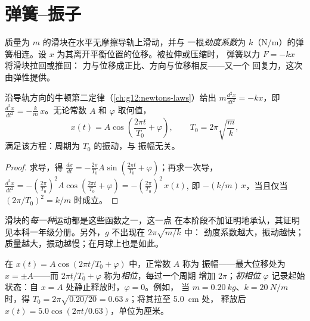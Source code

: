 \section{弹簧–振子}

\begin{definition}[弹簧的回复力]\label{def:g12:oscillators-and-time:spring}
质量为 $m$ 的滑块在水平无摩擦导轨上滑动，并与
一根\emph{劲度系数}为 $k$（\unit{N/m}）的弹簧相连。设
$x$ 为其离开平衡位置的位移。被拉伸或压缩时，
弹簧以力 $F = -kx$ 将滑块拉回或推回：
力与位移成正比、方向与位移相反——又一个
回复力，这次由弹性提供。
\end{definition}

\begin{proposition}[运动方程及其解]\label{prop:g12:oscillators-and-time:spring-period}
沿导轨方向的牛顿第二定律（\cref{ch:g12:newtons-laws}）给出
$m \frac{d^2x}{dt^2} = -kx$，即 $\frac{d^2x}{dt^2} =
-\frac{k}{m}\,x$。无论常数 $A$ 和 $\varphi$ 取何值，
\[
x(t) = A \cos\!\left(\frac{2\pi t}{T_0} + \varphi\right),
\qquad T_0 = 2\pi\sqrt{\frac{m}{k}},
\]
满足该方程：周期为 $T_0$ 的振动，与
振幅无关。
\end{proposition}

\begin{proof}
求导，得 $\frac{dx}{dt} = -\frac{2\pi}{T_0}A \sin(\frac{2\pi
t}{T_0} + \varphi)$；再求一次导，$\frac{d^2x}{dt^2} = -(\frac{2\pi}{T_0})^2
A\cos(\frac{2\pi t}{T_0} + \varphi) = -(\frac{2\pi}{T_0})^2\,x(t)$,
即 $-(k/m)\,x$，当且仅当 $(2\pi/T_0)^2 = k/m$ 时成立。
\end{proof}

\begin{remark}[所有可能的运动]\label{rem:g12:oscillators-and-time:uniqueness}
滑块的\emph{每一种}运动都是这些函数之一，这一点
在本阶段不加证明地承认，其证明见本科一年级分册。另外，$g$ 不出现在 $2\pi\sqrt{m/k}$ 中：
劲度系数越大，振动越快；质量越大，振动越慢；在月球上也是如此。
\end{remark}

\begin{definition}[振幅与相位]\label{def:g12:oscillators-and-time:phase}
在 $x(t) = A\cos(2\pi t/T_0 + \varphi)$ 中，正常数 $A$ 称为
振幅——最大位移处为 $x = \pm A$——而 $2\pi t/T_0 +
\varphi$ 称为\emph{相位}，每过一个周期
增加 $2\pi$；\emph{初相位} $\varphi$
记录起始状态：自 $x = A$ 处静止释放时，$\varphi = 0$。例如，
当 $m = \qty{0.20}{kg}$、$k = \qty{20}{N/m}$ 时，得 $T_0 =
2\pi\sqrt{0.20/20} = \qty{0.63}{s}$；将其拉至 \qty{5.0}{cm} 处，
释放后 $x(t) = 5.0\cos(2\pi t/0.63)$，单位为厘米。
\end{definition}

